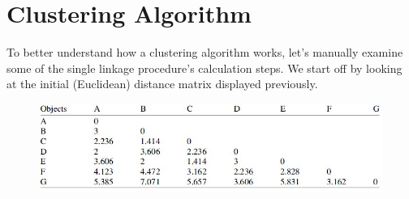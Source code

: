 \documentclass[a4paper,12pt]{article}
\begin{document}
\section{Clustering Algorithm}
To better understand how a clustering algorithm works, let’s manually examine
some of the single linkage procedure’s calculation steps. We start off by looking at
the initial (Euclidean) distance matrix displayed previously.

\begin{figure}[h!]
	\begin{center}
		\includegraphics[scale=0.6]{images/DistanceMatrix.jpg}\\
	\end{center}
\end{figure}
\end{document}
